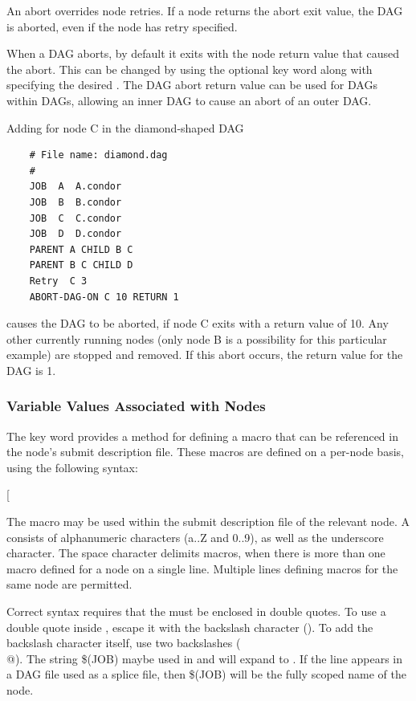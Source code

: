 An abort overrides node retries. 
If a node returns the abort exit value,
the DAG is aborted,
even if the node has retry specified.

When a DAG aborts, by default it exits with the node return value that
caused the abort.  This can be changed by 
using  the optional  key word along
with specifying the desired .
The DAG abort return value
can be used for DAGs within DAGs,
allowing an inner DAG to cause an abort of an outer DAG.

Adding  for node C in the diamond-shaped
DAG
\footnotesize
\begin{verbatim}
    # File name: diamond.dag
    #
    JOB  A  A.condor 
    JOB  B  B.condor 
    JOB  C  C.condor	
    JOB  D  D.condor
    PARENT A CHILD B C
    PARENT B C CHILD D
    Retry  C 3
    ABORT-DAG-ON C 10 RETURN 1
\end{verbatim}
\normalsize

causes the DAG to be aborted, if node C exits with a return value of 10.
Any other currently running nodes (only node B is a possibility for 
this particular example) are stopped and removed.
If this abort occurs, the return value for the DAG is 1.


\subsubsection{\label{dagman:VARS}Variable Values Associated with Nodes}

The  key word provides a
method for defining a macro that can be referenced in the
node's submit description file.
These macros are defined on a per-node basis, using the
following syntax:

   [\Arg{"string"\Dots]}

The macro may be used within the
submit description file of the relevant node.  A 
consists of alphanumeric characters (a..Z and 0..9),
as well as the underscore character.
The space character delimits macros,
when there is more than one macro defined for a node on a single line.
Multiple lines defining macros for the same node are permitted.

Correct syntax requires that the  must be
enclosed in double quotes.
To use a double quote inside ,
escape it with the backslash character (\verb@\@).
To add the backslash character itself, use two backslashes (\verb@\\@).
The string \$(JOB) maybe used in  and will expand to
. 
If the  line appears in a DAG file used as a splice file, 
then \$(JOB) will be the fully scoped name of the node.

